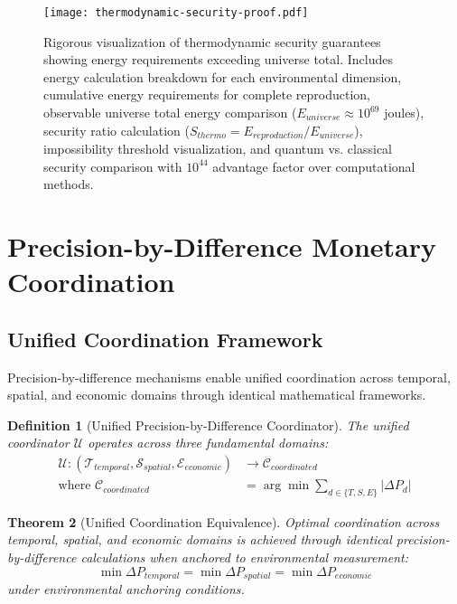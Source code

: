 \documentclass[12pt,a4paper]{article}
\newtheorem{theorem}{Theorem}
\newtheorem{definition}[theorem]{Definition}
\begin{document}
\begin{figure}[H]
\centering
\texttt{[image: thermodynamic-security-proof.pdf]}
\caption{Rigorous visualization of thermodynamic security guarantees showing energy requirements exceeding universe total. Includes energy calculation breakdown for each environmental dimension, cumulative energy requirements for complete reproduction, observable universe total energy comparison ($E_{universe} ≈ 10^{69}$ joules), security ratio calculation ($S_{thermo} = E_{reproduction}/E_{universe}$), impossibility threshold visualization, and quantum vs. classical security comparison with $10^{44}$ advantage factor over computational methods.}
\label{fig:thermodynamic_security}
\end{figure}

\section{Precision-by-Difference Monetary Coordination}

\subsection{Unified Coordination Framework}

Precision-by-difference mechanisms enable unified coordination across temporal, spatial, and economic domains through identical mathematical frameworks.

\begin{definition}[Unified Precision-by-Difference Coordinator]
The unified coordinator $\mathcal{U}$ operates across three fundamental domains:
\begin{align}
\mathcal{U}: (\mathcal{T}_{temporal}, \mathcal{S}_{spatial}, \mathcal{E}_{economic}) &\to \mathcal{C}_{coordinated} \\
\text{where } \mathcal{C}_{coordinated} &= \arg\min \sum_{d \in \{T,S,E\}} |\Delta P_d|
\end{align}
\end{definition}

\begin{theorem}[Unified Coordination Equivalence]
Optimal coordination across temporal, spatial, and economic domains is achieved through identical precision-by-difference calculations when anchored to environmental measurement:
\begin{equation}
\min \Delta P_{temporal} = \min \Delta P_{spatial} = \min \Delta P_{economic}
\end{equation}
under environmental anchoring conditions.
\end{theorem}
\end{document}
